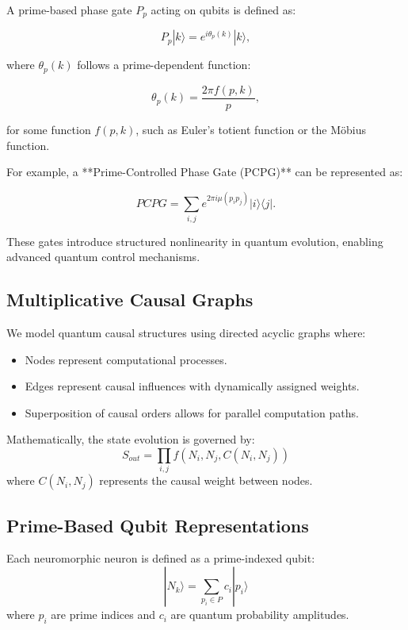 \documentclass{article}
\theoremstyle{plain}
\begin{document}
A prime-based phase gate \( P_p \) acting on qubits is defined as:

\begin{equation}
P_p |k\rangle = e^{i \theta_p(k)} |k\rangle,
\end{equation}

where \( \theta_p(k) \) follows a prime-dependent function:

\begin{equation}
\theta_p(k) = \frac{2\pi f(p,k)}{p},
\end{equation}

for some function \( f(p,k) \), such as Euler's totient function or the Möbius function.

For example, a **Prime-Controlled Phase Gate (PCPG)** can be represented as:

\begin{equation}
PCPG = \sum_{i,j} e^{2\pi i \mu(p_i p_j)} |i\rangle \langle j|.
\end{equation}

These gates introduce structured nonlinearity in quantum evolution, enabling advanced quantum control mechanisms.

\subsection{Multiplicative Causal Graphs}
We model quantum causal structures using directed acyclic graphs where:
\begin{itemize}
    \item Nodes represent computational processes.
    \item Edges represent causal influences with dynamically assigned weights.
    \item Superposition of causal orders allows for parallel computation paths.
\end{itemize}
Mathematically, the state evolution is governed by:
\begin{equation}
S_{out} = \prod_{i,j} f(N_i, N_j, C(N_i, N_j))
\end{equation}
where $C(N_i, N_j)$ represents the causal weight between nodes.


\subsection{Prime-Based Qubit Representations}
Each neuromorphic neuron is defined as a prime-indexed qubit:
\begin{equation}
|N_k\rangle = \sum_{p_i \in P} c_i |p_i\rangle
\end{equation}
where $p_i$ are prime indices and $c_i$ are quantum probability amplitudes.
\end{document}
